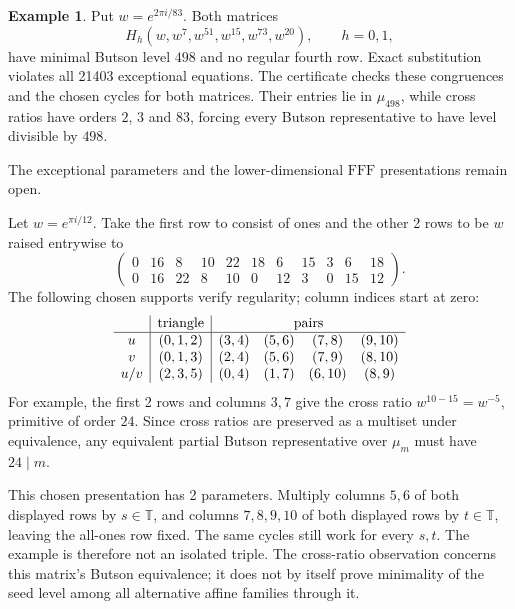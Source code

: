 \documentclass[11pt,a4paper]{article}
\theoremstyle{plain}
\theoremstyle{definition}
\newtheorem{example}[theorem]{Example}
\theoremstyle{plain}
\begin{document}
\par\addvspace{\medskipamount}\noindent
\begin{minipage}{\linewidth}
\begin{example}\label{fff_generic:examples}
Put $w=e^{2\pi i/83}$. Both matrices
$$H_h(w,w^7,w^{51},w^{15},w^{73},w^{20}),\qquad h=0,1,$$
have minimal Butson level $498$ and no regular fourth row. Exact substitution violates all 21403 exceptional equations. The certificate checks these congruences and the chosen cycles for both matrices. Their entries lie in $\mu_{498}$, while cross ratios have orders $2$, $3$ and $83$, forcing every Butson representative to have level divisible by $498$.
\end{example}
\end{minipage}
\par\addvspace{\medskipamount}

The exceptional parameters and the lower-dimensional $\mathrm{FFF}$ presentations remain open.

\medskip
Let $w=e^{\pi i/12}$. Take the first row to consist of ones and the other 2 rows to be $w$ raised entrywise to
$$\begin{pmatrix}
0&16&8&10&22&18&6&15&3&6&18\\
0&16&22&8&10&0&12&3&0&15&12
\end{pmatrix}.$$
The following chosen supports verify regularity; column indices start at zero:
$$\begin{array}{c|c|cccc}
&\text{triangle}&\multicolumn{4}{c}{\text{pairs}}\\ \hline
u&(0,1,2)&(3,4)&(5,6)&(7,8)&(9,10)\\
v&(0,1,3)&(2,4)&(5,6)&(7,9)&(8,10)\\
u/v&(2,3,5)&(0,4)&(1,7)&(6,10)&(8,9)
\end{array}$$
For example, the first 2 rows and columns $3,7$ give the cross ratio $w^{10-15}=w^{-5}$, primitive of order $24$. Since cross ratios are preserved as a multiset under equivalence, any equivalent partial Butson representative over $\mu_m$ must have $24\mid m$.

This chosen presentation has 2 parameters. Multiply columns $5,6$ of both displayed rows by $s\in\mathbb{T}$, and columns $7,8,9,10$ of both displayed rows by $t\in\mathbb{T}$, leaving the all-ones row fixed. The same cycles still work for every $s,t$. The example is therefore not an isolated triple. The cross-ratio observation concerns this matrix's Butson equivalence; it does not by itself prove minimality of the seed level among all alternative affine families through it.
\end{document}
